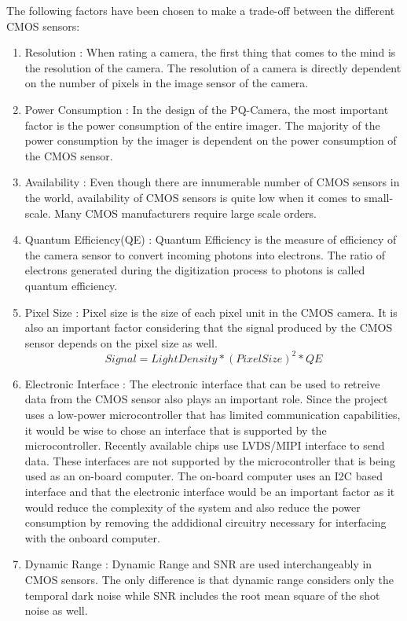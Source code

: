 The following factors have been chosen to  make a trade-off between the different CMOS sensors:
\begin{enumerate}
\item Resolution : When rating a camera, the first thing that comes to the mind is the resolution of the camera. The resolution of a camera is directly dependent on the number of pixels in the image sensor of the camera. 
\item Power Consumption : In the design of the PQ-Camera, the most important factor is the power consumption of the entire imager. The majority of the power consumption by the imager is dependent on the power consumption of the CMOS sensor. 
\item Availability : Even though there are innumerable number of CMOS sensors in the world, availability of CMOS sensors is quite low when it comes to small-scale. Many CMOS manufacturers require large scale orders.
\item Quantum Efficiency(QE) : Quantum Efficiency is the measure of efficiency of the camera sensor to convert incoming photons into electrons. The ratio of electrons generated during the digitization process to photons is called quantum efficiency.
\item Pixel Size : Pixel size is the size of each pixel unit in the CMOS camera. It is also an important factor considering that the signal produced by the CMOS sensor depends on the pixel size as well.
$$
Signal = Light Density * (Pixel Size)^2 * QE
$$
\item Electronic Interface : The electronic interface that can be used to retreive data from the CMOS sensor also plays an important role. Since the project uses a low-power microcontroller that has limited communication capabilities, it would be wise to chose an interface that is supported by the microcontroller. Recently available chips use LVDS/MIPI interface to send data. These interfaces are not supported by the microcontroller that is being used as an on-board computer. The on-board computer uses an I2C based interface and that the electronic interface would be an important factor as it would reduce the complexity of the system and also reduce the power consumption by removing the addidional circuitry necessary for interfacing with the onboard computer.

\item Dynamic Range : Dynamic Range and SNR are used interchangeably in CMOS sensors. The only difference is that dynamic range considers only the temporal dark noise while SNR includes the root mean square of the shot noise as well.  


\end{enumerate}
